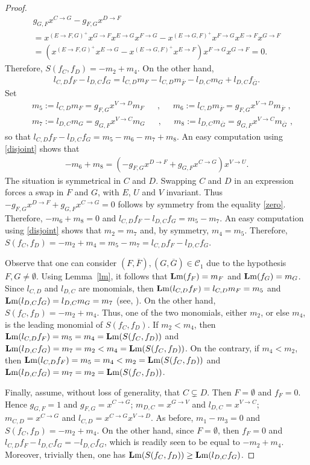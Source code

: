 \documentclass[ALCO]{cedram}
\newcommand{\lm}{\mbox{${\bf L}{\rm m}$}}
\newcommand{\mcc}{\mbox{$\mathcal{C}$}}
\begin{document}
\begin{proof}
\begin{multline}\label{zero}
g_{G,F}x^{C\to G}-g_{F,G}x^{D\to F}\\
=x^{(E\to F,G)^{+}}x^{G\to F}x^{E\to G}x^{F\to G}-
x^{(E\to G,F)^{+}}x^{F\to G}x^{E\to F}x^{G\to F}\\
=(x^{(E\to F,G)^{+}}x^{E\to G}-x^{(E\to G,F)^{+}}x^{E\to F})x^{F\to G}x^{G\to F}=0.
\end{multline}
Therefore, $S(f_C,f_D)=-m_2+m_4$. On the other hand,
\begin{eqnarray*}
l_{C,D}f_F-l_{D,C}f_G=l_{C,D}m_F-l_{C,D}m_{\overline{F}}-
l_{D,C}m_G+l_{D,C}f_{\overline{G}}.
\end{eqnarray*}
Set
\begin{eqnarray*}
&&m_5:=l_{C,D}m_{F}=g_{F,G}x^{V\to D}m_F\phantom{+}\mbox{ ,
  }\phantom{+} m_6:=l_{C,D}m_{\overline{F}}=g_{F,G}x^{V\to
    D}m_{\overline{F}}\mbox{ , }\\&& m_7:=l_{D,C}m_G=g_{G,F}x^{V\to
    C}m_G\phantom{+}\mbox{ ,
  }\phantom{+}m_8:=l_{D,C}m_{\overline{G}}=g_{G,F}x^{V\to
    C}m_{\overline{G}}\mbox{ , }
\end{eqnarray*}
so that $l_{C,D}f_F-l_{D,C}f_G=m_5-m_6-m_7+m_8$. An easy computation
using \eqref{disjoint} shows that
\begin{eqnarray*}
-m_6+m_8=(-g_{F,G}x^{D\to F}+g_{G,F}x^{C\to G})x^{V\to U}.
\end{eqnarray*}
The situation is symmetrical in $C$ and $D$. Swapping $C$ and $D$ in
an expression forces a swap in $F$ and $G$, with $E$, $U$ and $V$
invariant. Thus $-g_{F,G}x^{D\to F}+g_{G,F}x^{C\to G}=0$ follows by
symmetry from the equality \eqref{zero}. Therefore, $-m_6+m_8=0$ and
$l_{C,D}f_F-l_{D,C}f_G=m_5-m_7$. An easy computation using
\eqref{disjoint} shows that $m_2=m_7$ and, by symmetry,
$m_4=m_5$. Therefore,
$S(f_C,f_D)=-m_2+m_4=m_5-m_7=l_{C,D}f_F-l_{D,C}f_G$.

Observe that one can consider
$(F,\overline{F}),(G,\overline{G})\in\mcc_1$ due to the hypothesis
$F,G\neq\emptyset$. Using Lemma~\ref{lm}, it follows that
$\lm(f_F)=m_F$ and $\lm(f_G)=m_G$. Since $l_{C,D}$ and $l_{D,C}$ are
monomials, then $\lm(l_{C,D}f_F)=l_{C,D}m_F=m_5$ and
$\lm(l_{D,C}f_G)=l_{D,C}m_G=m_7$ (see, \eg \cite[\S2.2,
  Exercise~11]{clo}).  On the other hand, $S(f_C,f_D)=-m_2+m_4$. Thus,
one of the two monomials, either $m_2$, or else $m_4$, is the leading
monomial of $S(f_C,f_D)$. If $m_2<m_4$, then
$\lm(l_{C,D}f_F)=m_5=m_4=\lm(S(f_C,f_D))$ and
$\lm(l_{D,C}f_G)=m_7=m_2<m_4=\lm(S(f_C,f_D))$. On the contrary, if
$m_4<m_2$, then $\lm(l_{C,D}f_F)=m_5=m_4<m_2=\lm(S(f_C,f_D))$ and
$\lm(l_{D,C}f_G)=m_7=m_2=\lm(S(f_C,f_D))$.

Finally, assume, without loss of generality, that $C\subsetneq
D$. Then $F=\emptyset$ and $f_F=0$. Hence $g_{G,F}=1$ and
$g_{F,G}=x^{C\to G}$; $m_{D,C}=x^{G\to V}$ and $l_{D,C}=x^{V\to C}$;
$m_{C,D}=x^{C\to G}$ and $l_{C,D}=x^{C\to G}x^{V\to D}$. As before,
$m_1-m_3=0$ and $S(f_C,f_D)=-m_2+m_4$. On the other hand, since
$F=\emptyset$, then $f_F=0$ and $l_{C,D}f_F-l_{D,C}f_G=-l_{D,C}f_G$,
which is readily seen to be equal to $-m_2+m_4$. Moreover, trivially
then, one has $\lm(S(f_C,f_D))\geq\lm(l_{D,C}f_G)$.
\end{proof}
\end{document}
